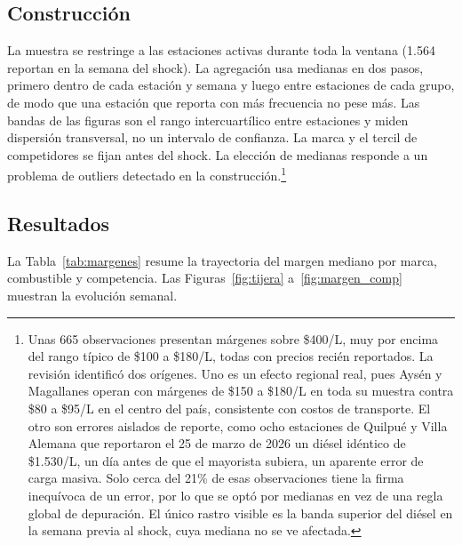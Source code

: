 \documentclass[11pt]{article}
\begin{document}
\subsection{Construcción}
\label{sec:margenes_construccion}

La muestra se restringe a las estaciones activas durante toda la ventana
(1.564 reportan en la semana del shock). La agregación usa medianas en dos
pasos, primero dentro de cada estación y semana y luego entre estaciones de
cada grupo, de modo que una estación que reporta con más frecuencia no pese
más. Las bandas de las figuras son el rango intercuartílico entre estaciones
y miden dispersión transversal, no un intervalo de confianza. La marca y el
tercil de competidores se fijan antes del shock. La elección de medianas
responde a un problema de outliers detectado en la
construcción.\footnote{Unas 665 observaciones presentan márgenes sobre
\$400/L, muy por encima del rango típico de \$100 a \$180/L, todas con
precios recién reportados. La revisión identificó dos orígenes. Uno es un
efecto regional real, pues Aysén y Magallanes operan con márgenes de \$150 a
\$180/L en toda su muestra contra \$80 a \$95/L en el centro del país,
consistente con costos de transporte. El otro son errores aislados de
reporte, como ocho estaciones de Quilpué y Villa Alemana que reportaron el
25 de marzo de 2026 un diésel idéntico de \$1.530/L, un día antes de que el
mayorista subiera, un aparente error de carga masiva. Solo cerca del 21\% de
esas observaciones tiene la firma inequívoca de un error, por lo que se
optó por medianas en vez de una regla global de depuración. El único rastro
visible es la banda superior del diésel en la semana previa al shock, cuya
mediana no se ve afectada.}

\subsection{Resultados}
\label{sec:margenes_resultados}

La Tabla~\ref{tab:margenes} resume la trayectoria del margen mediano por
marca, combustible y competencia. Las Figuras~\ref{fig:tijera}
a~\ref{fig:margen_comp} muestran la evolución semanal.
\end{document}
